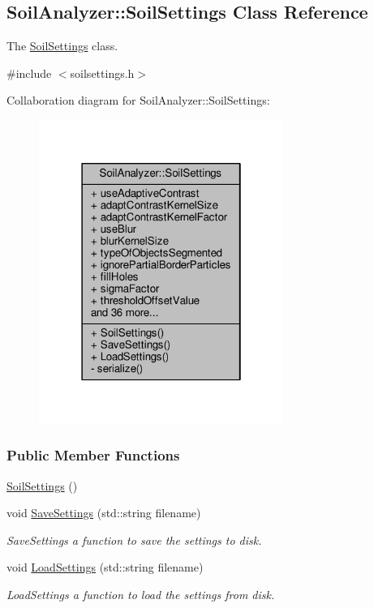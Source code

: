 \hypertarget{class_soil_analyzer_1_1_soil_settings}{}\subsection{Soil\+Analyzer\+:\+:Soil\+Settings Class Reference}
\label{class_soil_analyzer_1_1_soil_settings}


The \hyperlink{class_soil_analyzer_1_1_soil_settings}{Soil\+Settings} class.  




{\ttfamily \#include $<$soilsettings.\+h$>$}



Collaboration diagram for Soil\+Analyzer\+:\+:Soil\+Settings\+:
\nopagebreak
\begin{figure}[H]
\begin{center}
\leavevmode
\includegraphics[width=226pt]{class_soil_analyzer_1_1_soil_settings__coll__graph}
\end{center}
\end{figure}
\subsubsection*{Public Member Functions}
\begin{DoxyCompactItemize}
\item 
\hyperlink{class_soil_analyzer_1_1_soil_settings_ab8359b9a5ea27e6296e79a82789c8719}{Soil\+Settings} ()
\item 
void \hyperlink{class_soil_analyzer_1_1_soil_settings_ab211c361df454e8e1e29a4bddedeba81}{Save\+Settings} (std\+::string filename)
\begin{DoxyCompactList}\small\item\em Save\+Settings a function to save the settings to disk. \end{DoxyCompactList}\item 
void \hyperlink{class_soil_analyzer_1_1_soil_settings_a438bf660eeb7a49a676eef5da129f8d5}{Load\+Settings} (std\+::string filename)
\begin{DoxyCompactList}\small\item\em Load\+Settings a function to load the settings from disk. \end{DoxyCompactList}\end{DoxyCompactItemize}

